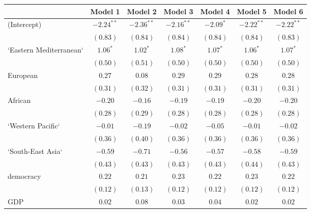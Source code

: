 
\begin{table}[!h]
\begin{center}
\begin{tabular}{l c c c c c c }
\toprule
 & Model 1 & Model 2 & Model 3 & Model 4 & Model 5 & Model 6 \\
\midrule
(Intercept)             & $-2.24^{**}$ & $-2.36^{**}$ & $-2.16^{**}$ & $-2.09^{*}$  & $-2.22^{**}$ & $-2.22^{**}$ \\
                        & $(0.83)$     & $(0.84)$     & $(0.84)$     & $(0.84)$     & $(0.84)$     & $(0.83)$     \\
`Eastern Mediterranean` & $1.06^{*}$   & $1.02^{*}$   & $1.08^{*}$   & $1.07^{*}$   & $1.06^{*}$   & $1.07^{*}$   \\
                        & $(0.50)$     & $(0.51)$     & $(0.50)$     & $(0.50)$     & $(0.50)$     & $(0.50)$     \\
European                & $0.27$       & $0.08$       & $0.29$       & $0.29$       & $0.28$       & $0.28$       \\
                        & $(0.31)$     & $(0.32)$     & $(0.31)$     & $(0.31)$     & $(0.31)$     & $(0.31)$     \\
African                 & $-0.20$      & $-0.16$      & $-0.19$      & $-0.19$      & $-0.20$      & $-0.20$      \\
                        & $(0.28)$     & $(0.29)$     & $(0.28)$     & $(0.28)$     & $(0.28)$     & $(0.28)$     \\
`Western Pacific`       & $-0.01$      & $-0.19$      & $-0.02$      & $-0.05$      & $-0.01$      & $-0.02$      \\
                        & $(0.36)$     & $(0.40)$     & $(0.36)$     & $(0.36)$     & $(0.36)$     & $(0.36)$     \\
`South-East Asia`       & $-0.59$      & $-0.71$      & $-0.56$      & $-0.57$      & $-0.58$      & $-0.59$      \\
                        & $(0.43)$     & $(0.43)$     & $(0.43)$     & $(0.43)$     & $(0.44)$     & $(0.43)$     \\
democracy               & $0.22$       & $0.21$       & $0.23$       & $0.22$       & $0.23$       & $0.22$       \\
                        & $(0.12)$     & $(0.13)$     & $(0.12)$     & $(0.12)$     & $(0.12)$     & $(0.12)$     \\
GDP                     & $0.02$       & $0.08$       & $0.03$       & $0.04$       & $0.02$       & $0.02$       \\

\end{tabular}
\end{center}
\end{table}

